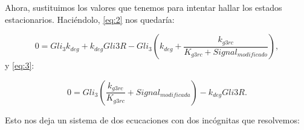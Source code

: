 Ahora, sustituimos los valores que tenemos para intentar hallar los estados estacionarios. Haciéndolo, \ref{eq:2} nos quedaría:

\begin{equation}
0 = Gli_3k_{deg}+k_{deg}Gli3R-Gli_3\left(k_{deg}+\frac{k_{g3rc}}{K_{g3rc}+Signal_{modificado}}\right),
\label{eq:2-modified}
\end{equation}
y \ref{eq:3}:

\begin{equation}
0=Gli_3\left(\frac{k_{g3rc}}{K_{g3rc}}+Signal_{modificada}\right)-k_{deg}Gli3R.
	\label{eq:3-modified}
\end{equation}

Esto nos deja un sistema de dos ecucaciones con dos incógnitas que resolvemos:









